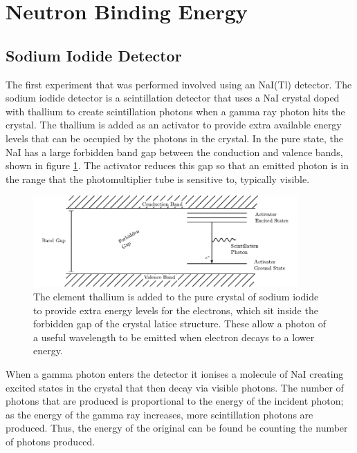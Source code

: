 
\section{Neutron Binding Energy} %
\label{sec:neutron_binding_energy}

\subsection{Sodium Iodide Detector} %
\label{ssub:sodium_iodide_detector}
The first experiment that was performed involved using an NaI(Tl) detector. The sodium iodide detector is a scintillation detector that uses a NaI crystal doped with thallium to create scintillation photons when a gamma ray photon hits the crystal. The thallium is added as an activator to provide extra available energy levels that can be occupied by the photons in the crystal. In the pure state, the NaI has a large forbidden band gap between the conduction and valence bands, shown in figure \ref{fig:thaliumactivator}. The activator reduces this gap so that an emitted photon is in the range that the photomultiplier tube is sensitive to, typically visible.
\begin{figure}[ht]
	\centering
	\includegraphics[width=0.9\textwidth]{NaIbands.pdf}
	\caption{The element thallium is added to the pure crystal of sodium iodide to provide extra energy levels for the electrons, which sit inside the forbidden gap of the crystal latice structure. These allow a photon of a useful wavelength to be emitted when electron decays to a lower energy.\label{fig:thaliumactivator}}
\end{figure}

When a gamma photon enters the detector it ionises a molecule of NaI creating excited states in the crystal that then decay via visible photons. The number of photons that are produced is proportional to the energy of the incident photon; as the energy of the gamma ray increases, more scintillation photons are produced. Thus, the energy of the original can be found be counting the number of photons produced. 


